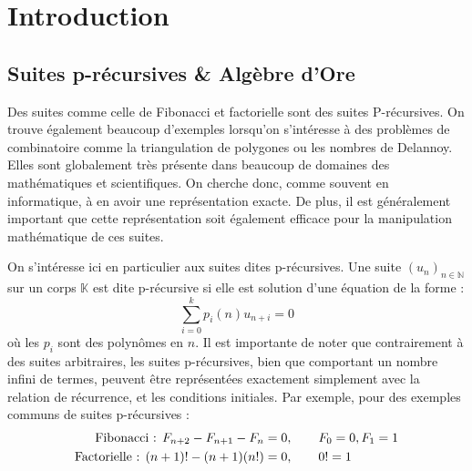 \documentclass[12pt]{article}
\begin{document}

\setcounter{tocdepth}{2}

\newpage
\tableofcontents
\newpage

\section{Introduction}
    \label{sec:intro}
    \subsection{Suites p-récursives \& Algèbre d'Ore}
        \label{sec:prec}
        \par Des suites comme celle de Fibonacci et factorielle sont des suites P-récursives.
        On trouve également beaucoup d'exemples lorsqu'on s'intéresse à des problèmes
        de combinatoire comme la triangulation de polygones ou les nombres de Delannoy. Elles sont
        globalement très présente dans beaucoup de domaines des mathématiques et scientifiques.
        On cherche donc, comme souvent en informatique, à en avoir une
        représentation exacte. De plus, il est généralement important que cette représentation
        soit également efficace pour la manipulation mathématique de ces suites.
        \par On s'intéresse ici en particulier aux suites dites p-récursives.
        Une suite $(u_n)_{n\in\mathbb N}$ sur un corps $\mathbb K$ est dite p-récursive
        si elle est solution d'une équation de la forme :
        \begin{equation}
            \sum_{i=0}^k p_i(n) u_{n+i} = 0
        \end{equation}
        où les $p_i$ sont des polynômes en $n$. Il est importante de noter que contrairement
        à des suites arbitraires, les suites p-récursives, bien que comportant un nombre
        infini de termes, peuvent être représentées exactement simplement
        avec la relation de récurrence, et les conditions initiales.
        Par exemple, pour des exemples communs de suites p-récursives : 
        \begin{align*}
            \textnormal{Fibonacci : } F_{n+2} - F_{n+1} - F_n &= 0, \qquad F_0=0, F_1=1\\
            \textnormal{Factorielle : } (n+1)! - (n+1)(n!) &= 0, \qquad 0!=1
        \end{align*}
\end{document}
